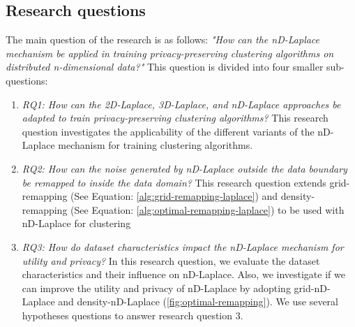 \subsection{Research questions}
The main question of the research is as follows: \newline \newline
\textit{"How can the nD-Laplace mechanism be applied in training privacy-preserving clustering algorithms on distributed n-dimensional data?"} \newline
This question is divided into four smaller sub-questions:
\begin{enumerate}
    \item \textit{RQ1: How can the 2D-Laplace, 3D-Laplace, and nD-Laplace approaches be adapted to train privacy-preserving clustering algorithms?} \newline
          This research question investigates the applicability of the different variants of the nD-Laplace mechanism for training clustering algorithms.
    \item \textit{RQ2: How can the noise generated by nD-Laplace outside the data boundary be remapped to inside the data domain?} \newline
          This research question extends grid-remapping (See Equation: \ref{alg:grid-remapping-laplace}) and density-remapping (See Equation: \ref{alg:optimal-remapping-laplace}) to be used with nD-Laplace for clustering
    \item \textit{RQ3: How do dataset characteristics impact the nD-Laplace mechanism for utility and privacy?} \newline
          In this research question, we evaluate the dataset characteristics and their influence on nD-Laplace.
          Also, we investigate if we can improve the utility and privacy of nD-Laplace by adopting grid-nD-Laplace and density-nD-Laplace (\ref{fig:optimal-remapping}).
          We use several hypotheses questions to answer research question 3.


\end{enumerate}
